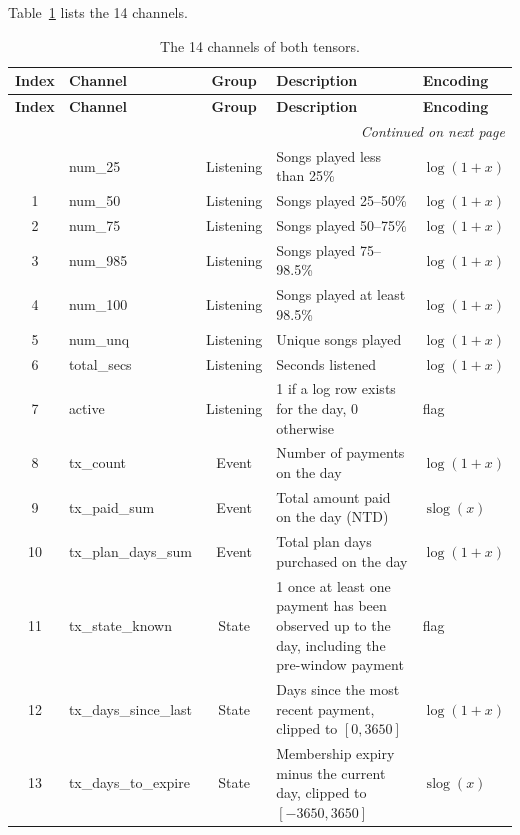 \documentclass{article}
\newcommand{\slog}{\operatorname{slog}}
\begin{document}
Table~\ref{tab:w2_channels} lists the 14 channels.

\renewcommand{\arraystretch}{1.3}
\begin{longtable}{|c|l|c|p{6.4cm}|l|}
\hline
\textbf{Index} & \textbf{Channel} & \textbf{Group} & \textbf{Description} & \textbf{Encoding} \\ \hline
\endfirsthead
\hline
\textbf{Index} & \textbf{Channel} & \textbf{Group} & \textbf{Description} & \textbf{Encoding} \\ \hline
\endhead
\hline
\multicolumn{5}{r}{\small\textit{Continued on next page}} \\
\endfoot
\hline
\caption{The 14 channels of both tensors.}
\label{tab:w2_channels}
\endlastfoot
0  & num\_25              & Listening & Songs played less than 25\% & $\log(1+x)$ \\ \hline
1  & num\_50              & Listening & Songs played 25--50\%       & $\log(1+x)$ \\ \hline
2  & num\_75              & Listening & Songs played 50--75\%       & $\log(1+x)$ \\ \hline
3  & num\_985             & Listening & Songs played 75--98.5\%     & $\log(1+x)$ \\ \hline
4  & num\_100             & Listening & Songs played at least 98.5\% & $\log(1+x)$ \\ \hline
5  & num\_unq             & Listening & Unique songs played         & $\log(1+x)$ \\ \hline
6  & total\_secs          & Listening & Seconds listened            & $\log(1+x)$ \\ \hline
7  & active               & Listening & 1 if a log row exists for the day, 0 otherwise & flag \\ \hline
8  & tx\_count            & Event & Number of payments on the day & $\log(1+x)$ \\ \hline
9  & tx\_paid\_sum        & Event & Total amount paid on the day (NTD) & $\slog(x)$ \\ \hline
10 & tx\_plan\_days\_sum  & Event & Total plan days purchased on the day & $\log(1+x)$ \\ \hline
11 & tx\_state\_known     & State & 1 once at least one payment has been observed up to the day, including the pre-window payment & flag \\ \hline
12 & tx\_days\_since\_last & State & Days since the most recent payment, clipped to $[0, 3650]$ & $\log(1+x)$ \\ \hline
13 & tx\_days\_to\_expire & State & Membership expiry minus the current day, clipped to $[-3650, 3650]$ & $\slog(x)$ \\ \hline
\end{longtable}
\end{document}

